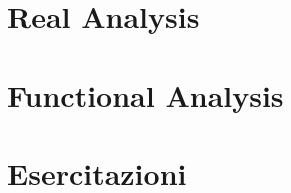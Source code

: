 \documentclass[10pt,a4paper,twoside]{book}
\numberwithin{figure}{section}
\numberwithin{equation}{section}
\begin{document}
\part{Real Analysis}
 \cleardoublepage
 \cleardoublepage
 \cleardoublepage
 \cleardoublepage
 \cleardoublepage
 \cleardoublepage
 \cleardoublepage
 \cleardoublepage
 \cleardoublepage

\part{Functional Analysis}
 \cleardoublepage
 \cleardoublepage
 \cleardoublepage
 \cleardoublepage
 \cleardoublepage
 \cleardoublepage
 \cleardoublepage
 \cleardoublepage

\part{Esercitazioni}
 \cleardoublepage
 \cleardoublepage
 \cleardoublepage
 \cleardoublepage
 \cleardoublepage
 \cleardoublepage
 \cleardoublepage
 \cleardoublepage
 \cleardoublepage
 \cleardoublepage
\end{document}
